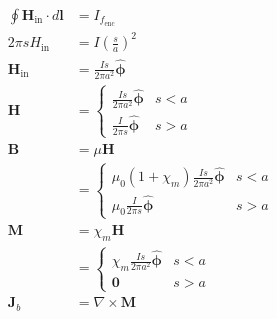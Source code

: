 \documentclass{article}
\renewcommand{\vec}[1]{\boldsymbol{\mathbf{#1}}}
\newcommand{\uvec}[1]{\hat{\vec{#1}}}
\begin{document}
\begin{align*}
  \oint \vec{H}_\text{in} \cdot d \vec{l} & = I_{f_\text{enc}}                                                                               \\
  2 \pi s H_\text{in}                     & = I \left( \frac{s}{a} \right)^2                                                                 \\
  \vec{H}_\text{in}                       & = \frac{I s}{2 \pi a^2} \uvec{\phi}                                                              \\
  \vec{H}                                 & = \begin{cases}
                                                \frac{I s}{2 \pi a^2} \uvec{\phi} & s < a \\
                                                \frac{I}{2 \pi s} \uvec{\phi}     & s > a
                                              \end{cases}                                                      \\
  \vec{B}                                 & = \mu \vec{H}                                                                                    \\
                                          & = \begin{cases}
                                                \mu_0 (1 + \chi_m) \frac{I s}{2 \pi a^2} \uvec{\phi} & s < a \\
                                                \mu_0 \frac{I}{2 \pi s} \uvec{\phi}                  & s > a
                                              \end{cases}                                   \\
  \vec{M}                                 & = \chi_m \vec{H}                                                                                 \\
                                          & = \begin{cases}
                                                \chi_m \frac{I s}{2 \pi a^2} \uvec{\phi} & s < a \\
                                                \vec{0}                                  & s > a
                                              \end{cases}                                               \\
  \vec{J}_b                               & = \nabla \times \vec{M}                                                                          \\

\end{align*}
\end{document}
